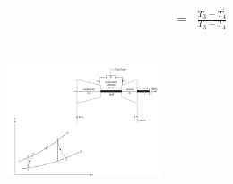 \documentclass[10pt,compress]{beamer}
\newcommand{\frc}{\displaystyle\frac}
\begin{document}
\begin{frame}
\begin{columns}
\begin{column}[c]{0.4\linewidth}
\begin{enumerate}[(1)]
{\begin{eqnarray}
                                          &=& \frc{T_{3}-T_{4}^{\prime}}{T_{3}-T_{4}}
         \end{eqnarray}}
    \end{enumerate}\vspace{-.8cm}
    \begin{center}
   \begin{figure}%
     \includegraphics[height=4.5cm,width=4.5cm,clip]{./Pics/Brayton_cycle3}
   \end{figure}  
    \end{center}
  \end{column}  
 \end{columns}
\end{frame}
\end{document}

